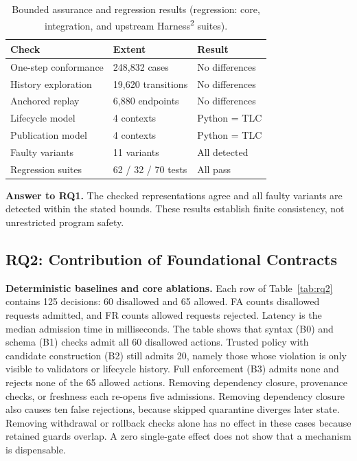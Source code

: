 \documentclass[letterpaper,journal]{IEEEtran}
\newcommand{\harness}{Harness\textsuperscript{2}}
\begin{document}
\begin{table}[t]\caption{Bounded assurance and regression results (regression: core, integration, and upstream \harness{} suites).}\label{tab:rq1}\centering\footnotesize
\setlength{\tabcolsep}{3pt}
\begin{tabular}{L{0.31\columnwidth}L{0.31\columnwidth}L{0.29\columnwidth}}\toprule
Check & Extent & Result\\\midrule
One-step conformance & 248,832 cases & No differences\\
History exploration & 19,620 transitions & No differences\\
Anchored replay & 6,880 endpoints & No differences\\
Lifecycle model & 4 contexts & Python = TLC\\
Publication model & 4 contexts & Python = TLC\\
Faulty variants & 11 variants & All detected\\
Regression suites & 62 / 32 / 70 tests & All pass\\\bottomrule
\end{tabular}\end{table}

\textbf{Answer to RQ1.} The checked representations agree and all faulty variants are detected within the stated bounds. These results establish finite consistency, not unrestricted program safety.

\subsection{RQ2: Contribution of Foundational Contracts}
\textbf{Deterministic baselines and core ablations.} Each row of Table~\ref{tab:rq2} contains 125 decisions: 60 disallowed and 65 allowed. FA counts disallowed requests admitted, and FR counts allowed requests rejected. Latency is the median admission time in milliseconds. The table shows that syntax (B0) and schema (B1) checks admit all 60 disallowed actions. Trusted policy with candidate construction (B2) still admits 20, namely those whose violation is only visible to validators or lifecycle history. Full enforcement (B3) admits none and rejects none of the 65 allowed actions. Removing dependency closure, provenance checks, or freshness each re-opens five admissions. Removing dependency closure also causes ten false rejections, because skipped quarantine diverges later state. Removing withdrawal or rollback checks alone has no effect in these cases because retained guards overlap. A zero single-gate effect does not show that a mechanism is dispensable.
\end{document}

